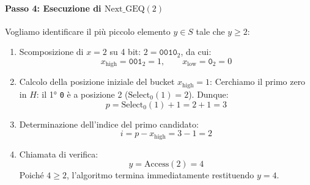 \paragraph{Passo 4: Esecuzione di $\text{Next\_GEQ}(2)$}
Vogliamo identificare il pi\`u piccolo elemento $y \in S$ tale che $y \ge 2$:
\begin{enumerate}
  \item Scomposizione di $x = 2$ su 4 bit: $2 = \texttt{0010}_2$, da cui:
  \begin{equation*}
    x_{\text{high}} = \texttt{001}_2 = 1, \qquad x_{\text{low}} = \texttt{0}_2 = 0
  \end{equation*}
  \item Calcolo della posizione iniziale del bucket $x_{\text{high}} = 1$:
  Cerchiamo il primo zero in $H$: il 1° \texttt{0} \`e a posizione 2 ($\text{Select}_0(1) = 2$).
  Dunque:
  \begin{equation*}
    p = \text{Select}_0(1) + 1 = 2 + 1 = 3
  \end{equation*}
  \item Determinazione dell'indice del primo candidato:
  \begin{equation*}
    i = p - x_{\text{high}} = 3 - 1 = 2
  \end{equation*}
  \item Chiamata di verifica:
  \begin{equation*}
    y = \text{Access}(2) = 4
  \end{equation*}
  Poich\'e $4 \ge 2$, l'algoritmo termina immediatamente restituendo $y = 4$.
\end{enumerate}
